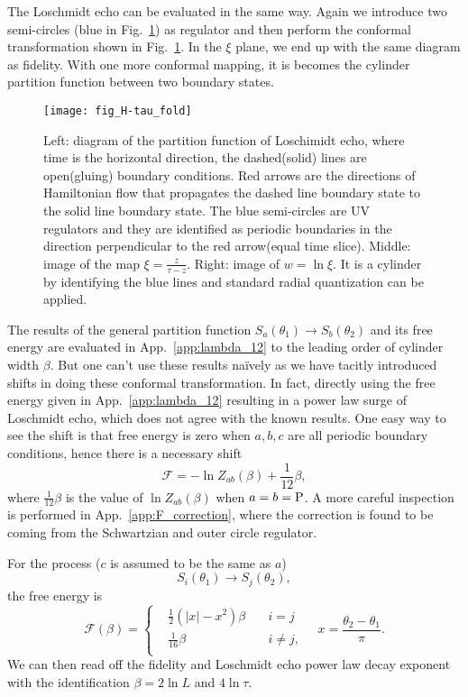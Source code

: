 The Loschmidt echo can be evaluated in the same way. Again we introduce two semi-circles (blue in Fig.~\ref{fig:H-tau_fold}) as regulator and then perform the conformal transformation shown in Fig.~\ref{fig:H-tau_fold}. In the $\xi$ plane, we end up with the same diagram as fidelity. With one more conformal mapping, it is becomes the cylinder partition function between two boundary states. 

\begin{figure}[htb]
\centering
\texttt{[image: fig\_H-tau\_fold]}
\caption{Left: diagram of the partition function of Loschimidt echo, where time is the horizontal direction, the dashed(solid) lines are open(gluing) boundary conditions. Red arrows are the directions of Hamiltonian flow that propagates the dashed line boundary state to the solid line boundary state. The blue semi-circles are UV regulators and they are identified as periodic boundaries in the direction perpendicular to the red arrow(equal time slice). Middle: image of the map $\xi = \frac{z}{\tau - z}$. Right: image of $w = \ln \xi$. It is a cylinder by identifying the blue lines and standard radial quantization can be applied. }
\label{fig:H-tau_fold}
\end{figure}

The results of the general partition function $S_a( \theta_1 ) \rightarrow S_b( \theta_2)$ and its free energy are evaluated in App.~\ref{app:lambda_12} to the leading order of cylinder width $\beta$. But one can't use these results na\"ively as we have tacitly introduced shifts in doing these conformal transformation. In fact, directly using the free energy given in App.~\ref{app:lambda_12} resulting in a power law surge of Loschmidt echo, which does not agree with the known results. One easy way to see the shift is that free energy is zero when $a,b,c$ are all periodic boundary conditions, hence there is a necessary shift
\begin{equation}
\mathcal{F} = - \ln Z_{ab} ( \beta ) + \frac{1}{12} \beta ,
\end{equation}
where $\frac{1}{12}\beta$ is the value of $ \ln Z_{ab} ( \beta )$ when $a = b = {\rm P}$. A more careful inspection is performed in App.~\ref{app:F_correction}, where the correction is found to be coming from the Schwartzian and outer circle regulator. 

For the process ($c$ is assumed to be the same as $a$)
\begin{equation}
S_i( \theta_1 ) \rightarrow S_j( \theta_2 ) ,
\end{equation}
the free energy is
\begin{equation}
\mathcal{F}( \beta )  = 
\left\lbrace
\begin{aligned}
  &\frac{1}{2}(|x| - x^2 )\beta  \quad &i = j \\
  &\frac{1}{16}\beta   \quad &i \ne j ,  \\
\end{aligned} \right. \quad x = \frac{\theta_2 - \theta_1}{\pi} .
\end{equation}
We can then read off the fidelity and Loschmidt echo power law decay exponent with the identification $\beta = 2 \ln L$ and $ 4 \ln \tau$. 

